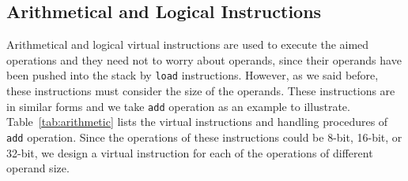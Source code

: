 \begin{table}[!t]
\renewcommand{\arraystretch}{1.1}
\begin{tabnote}
\end{tabnote}
\end{table}


\subsection{Arithmetical and Logical Instructions}
Arithmetical and logical virtual instructions are used to execute the aimed operations and they need not to worry about operands, since their operands have been pushed into the stack by \texttt{load} instructions. However, as we said before, these instructions must consider the size of the operands. These instructions are in similar forms and we take \texttt{add} operation as an example to illustrate. Table~\ref{tab:arithmetic} lists the virtual instructions and handling procedures of \texttt{add} operation. Since the operations of these instructions could be 8-bit, 16-bit, or 32-bit, we design a virtual instruction for each of the operations of different operand size.




